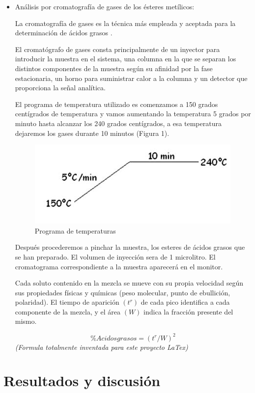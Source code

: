 \documentclass[a4paper,12pt]{article}
\begin{document}
\begin{multicols}{2}
\begin{itemize}
\item Análisis por cromatografía de gases de los ésteres metílicos:

La cromatografía de gases es la técnica más empleada y aceptada para la determinación de ácidos grasos \cite{VELASCO1999,Sineiro1998}.

El cromatógrafo de gases consta principalmente de un inyector para introducir la muestra en el sistema, una columna en la que se separan los distintos componentes de la muestra según
su afinidad por la fase estacionaria, un horno para suministrar calor a la columna y un detector que proporciona la señal analítica.

El programa de temperatura utilizado es comenzamos a 150 grados centígrados de temperatura y vamos aumentando la temperatura 5 grados por minuto hasta alcanzar los 240 grados centígrados, a esa temperatura dejaremos los gases durante 10 minutos (Figura 1).
\begin{figure}[H]

\raggedright
\includegraphics[scale=0.9]{Temperaturahorno}
\caption{Programa de temperaturas}
\label{fig: Figura 1}
\end{figure}

Después procederemos a pinchar la muestra, los esteres de ácidos grasos que se han preparado. El volumen de inyección sera de 1 microlitro. El cromatograma correspondiente a la muestra aparecerá en el monitor.

Cada soluto contenido en la mezcla se mueve con su propia velocidad según sus propiedades físicas y químicas (peso molecular, punto de ebullición, polaridad). 
El tiempo de aparición $(t^r)$ de cada pico identifica a cada componente de la mezcla, y el área $(W)$ indica la fracción presente del mismo.

\begin{equation*}
\% Acidos grasos = (t^r / W)^2 
\end{equation*}
\textit{(Formula totalmente inventada para este proyecto LaTex)}
\end{itemize}

\section{Resultados y discusión}


\end{multicols}
\end{document}
